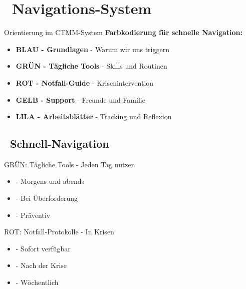 \section*{\textcolor{ctmmBlue}{\faMap~Navigations-System}}
\label{sec:navigation}

\begin{ctmmBlueBox}{Orientierung im CTMM-System}
\textbf{Farbkodierung für schnelle Navigation:}

\begin{itemize}
    \item \textcolor{ctmmBlue}{\textbf{BLAU - Grundlagen}} - Warum wir uns triggern
    \item \textcolor{ctmmGreen}{\textbf{GRÜN - Tägliche Tools}} - Skills und Routinen  
    \item \textcolor{ctmmRed}{\textbf{ROT - Notfall-Guide}} - Krisenintervention
    \item \textcolor{ctmmYellow}{\textbf{GELB - Support}} - Freunde und Familie
    \item \textcolor{ctmmPurple}{\textbf{LILA - Arbeitsblätter}} - Tracking und Reflexion
\end{itemize}
\end{ctmmBlueBox}

\vspace{0.5cm}

\subsection*{\faChevronRight~Schnell-Navigation}

\begin{ctmmGreenBox}{GRÜN: Tägliche Tools - Jeden Tag nutzen}
\begin{itemize}
    \item {} - Morgens und abends
    \item {} - Bei Überforderung
    \item {} - Präventiv
\end{itemize}
\end{ctmmGreenBox}

\begin{ctmmRedBox}{ROT: Notfall-Protokolle - In Krisen}
\begin{itemize}
    \item {} - Sofort verfügbar
    \item {} - Nach der Krise
    \item {} - Wöchentlich
\end{itemize}
\end{ctmmRedBox}

